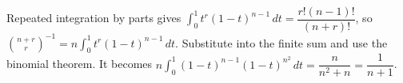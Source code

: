 Repeated integration by parts gives $\int_0^1 t^r(1-t)^{n-1}\,dt=\dfrac{r!(n-1)!}{(n+r)!}$, so $\binom{n+r}r^{-1}=n\int_0^1t^r(1-t)^{n-1}\,dt$. Substitute into the finite sum and use the binomial theorem. It becomes $n\int_0^1(1-t)^{n-1}(1-t)^{n^2}\,dt=\dfrac{n}{n^2+n}=\boxed{\dfrac{1}{n+1}}$.

